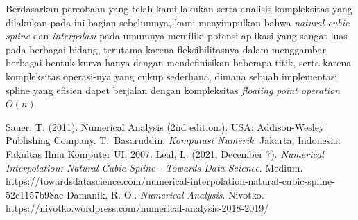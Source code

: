 \documentclass[journal,12pt,onecolumn,a4paper]{IEEEtran}
\begin{document}
Berdasarkan percobaan yang telah kami lakukan serta analisis kompleksitas yang dilakukan pada ini bagian sebelumnya, kami menyimpulkan bahwa \emph{natural cubic spline} dan \emph{interpolasi} pada umumnya memiliki potensi aplikasi yang sangat luas pada berbagai bidang, terutama karena fleksibilitasnya dalam menggambar berbagai bentuk kurva hanya dengan mendefinisikan beberapa titik, serta karena kompleksitas operasi-nya yang cukup sederhana, dimana sebuah implementasi spline yang efisien dapet berjalan dengan kompleksitas \emph{floating point operation} \(O(n)\).




\begin{thebibliography}{1}
	 Sauer, T. (2011). Numerical Analysis (2nd edition.). USA: Addison-Wesley Publishing Company.
	T.~Basaruddin, \emph{Komputasi Numerik}. Jakarta, Indonesia: Fakultas Ilmu Komputer UI, 2007.
	Leal, L. (2021, December 7). \emph{Numerical Interpolation: Natural Cubic Spline - Towards Data Science}. Medium. https://towardsdatascience.com/numerical-interpolation-natural-cubic-spline-52c1157b98ac
	Damanik, R. O.. \emph{Numerical Analysis}. Nivotko. https://nivotko.wordpress.com/numerical-analysis-2018-2019/
\end{thebibliography}

\end{document}
